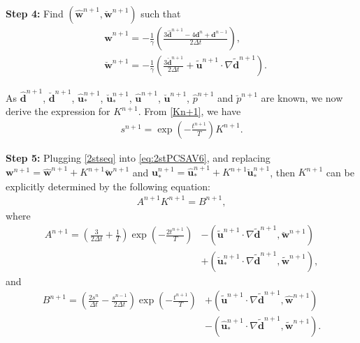 \documentclass[12pt,reqno]{amsart}
\numberwithin{equation}{section}
\newcommand{\uu}{\mathrm{\textbf{u}}}
\newcommand{\dd}{\mathrm{\textbf{d}}}
\newcommand{\ww}{\mathrm{\textbf{w}}}
\begin{document}
\textbf{Step 4:} Find $(\hat{\ww}^{n+1},\breve{\ww}^{n+1})$ such that
\begin{align}
& \hat{\ww}^{n+1} = -\frac{1}{\gamma}\left(\frac{3\hat{\dd}^{n+1}-4\dd^n+\dd^{n-1}}{2\Delta t}\right),\label{2stwhat}\\
& \breve{\ww}^{n+1} = -\frac{1}{\gamma}\left(\frac{3\breve{\dd}^{n+1}}{2\Delta t}+\tilde{\uu}^{n+1}\cdot\nabla\tilde{\dd}^{n+1}\right). \label{2stwbre}
\end{align}

As $\hat{\dd}^{n+1}$, $\breve{\dd}^{n+1}$,  $\hat{\uu}_*^{n+1}$, $\breve{\uu}_*^{n+1}$,  $\hat{\uu}^{n+1}$, $\breve{\uu}^{n+1}$,  $\hat{p}^{n+1}$ and $\breve{p}^{n+1}$ are known, we now derive the expression for $K^{n+1}$. From \eqref{Kn+1}, we have
\begin{align}
s^{n+1}=\exp\left(-\frac{t^{n+1}}{T}\right)K^{n+1}.\label{2stseq}
\end{align}

\textbf{Step 5:} 
Plugging \eqref{2stseq} into \eqref{eq:2stPCSAV6}, and replacing $\ww^{n+1} = \hat{\ww}^{n+1} + K^{n+1}\breve{\ww}^{n+1}$ and $\uu_*^{n+1} = \hat{\uu}_*^{n+1}+K^{n+1}\breve{\uu}_*^{n+1}$, then $K^{n+1}$ can be explicitly determined by the following equation:
\begin{align}\label{2stK^n+1}
A^{n+1}K^{n+1} = B^{n+1} ,
\end{align}
where
\begin{align}\label{An+1}
A^{n+1} = 
\left(\frac{3}{2\Delta t}+\frac{1}{T}\right)\exp\left(-\frac{2t^{n+1}}{T}\right)
&-\left( \tilde{\uu}^{n+1} \cdot \nabla \tilde{\dd}^{n+1}, \breve{\ww}^{n+1}\right)\nonumber\\
&+\left(\breve{\uu}_*^{n+1}\cdot \nabla \tilde{\dd}^{n+1},\tilde{\ww}^{n+1}\right),
\end{align}
and
\begin{align}\label{Bn+1}
B^{n+1} =  \left(\frac{2s^{n}}{\Delta t}-\frac{s^{n-1}}{2\Delta t}\right) \exp\left(-\frac{t^{n+1}}{T}\right)
&+ \left( \tilde{\uu}^{n+1}\cdot \nabla \tilde{\dd}^{n+1},\hat{\ww}^{n+1}\right)\nonumber\\
&- \left(\hat{\uu}_*^{n+1} \cdot \nabla \tilde{\dd}^{n+1},\tilde{\ww}^{n+1}\right) .
\end{align}
\end{document}
